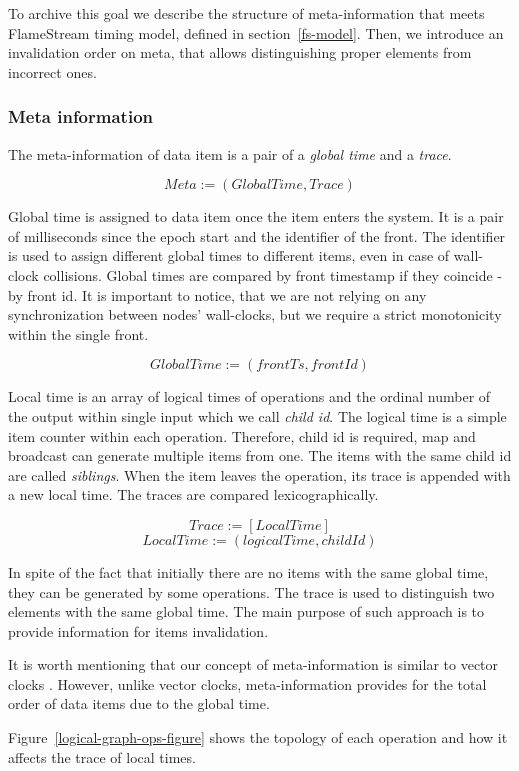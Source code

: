 To archive this goal we describe the structure of meta-information that meets FlameStream timing model, defined in section~\ref{fs-model}. Then, we introduce an invalidation order on meta, that allows distinguishing proper elements from incorrect ones.

\subsubsection{Meta information}
The meta-information of data item is a pair of a {\it global time} and a {\it trace}.

\[Meta := (GlobalTime, Trace)\]

Global time is assigned to data item once the item enters the system. It is a pair of milliseconds since the epoch start and the identifier of the front. The identifier is used to assign different global times to different items, even in case of wall-clock collisions. Global times are compared by front timestamp if they coincide - by front id. It is important to notice, that we are not relying on any synchronization between nodes' wall-clocks, but we require a strict monotonicity within the single front.

\[GlobalTime := (frontTs, frontId)\]

Local time is an array of logical times of operations and the ordinal number of the output within single input which we call {\it child id}. The logical time is a simple item counter within each operation. Therefore, child id is required, map and broadcast can generate multiple items from one. The items with the same child id are called {\it siblings}. When the item leaves the operation, its trace is appended with a new local time. The traces are compared lexicographically.

\[Trace := [LocalTime]\]
\[LocalTime := (logicalTime, childId)\]

In spite of the fact that initially there are no items with the same global time, they can be generated by some operations. The trace is used to distinguish two elements with the same global time. The main purpose of such approach is to provide information for items invalidation. 

It is worth mentioning that our concept of meta-information is similar to vector clocks
\cite{fidge1988timestamps, mattern88virtualtime}. However, unlike vector clocks, meta-information provides for the total order of data items due to the global time.

Figure~\ref{logical-graph-ops-figure} shows the topology of each operation and how it affects the trace of local times.

